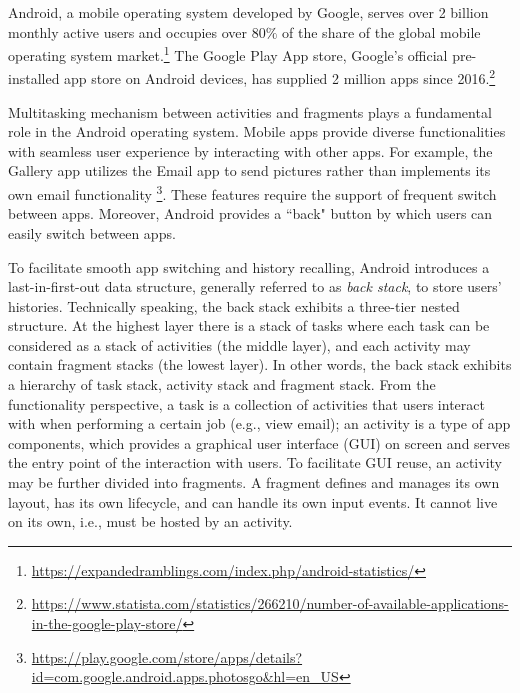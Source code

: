 
Android, a mobile operating system developed by Google, serves over 2 billion monthly active users and occupies over $80\%$ of the share of the global mobile operating system market.\footnote{\url{https://expandedramblings.com/index.php/android-statistics/}}
The Google Play App store, Google's official pre-installed app store on Android devices, has supplied 2 million apps since 2016.\footnote{\url{https://www.statista.com/statistics/266210/number-of-available-applications-in-the-google-play-store/}} 

Multitasking mechanism between activities and fragments plays a fundamental role in the Android operating system. Mobile apps provide diverse functionalities with seamless user experience by interacting with other apps.
For example, the Gallery app utilizes the Email app to send pictures rather than implements its own email
functionality \footnote{\url{https://play.google.com/store/apps/details?id=com.google.android.apps.photosgo&hl=en_US}}. These features require the support of frequent switch between apps. Moreover, Android provides a ``back" button by which users can easily switch between apps. 

To facilitate smooth app switching and history recalling, Android introduces a last-in-first-out data structure, generally referred to as \emph{back stack}, to store users’ histories.
Technically speaking, the back stack exhibits a three-tier nested structure. At the highest layer there is a stack of tasks where each task can be considered as a stack of activities (the middle layer), and each activity may contain fragment stacks (the lowest layer). In other words, the back stack exhibits a hierarchy of task stack, activity stack and fragment stack. From the functionality perspective, a task %
is a collection of activities that users interact with when performing a certain job (e.g., view email); an activity is a type of app components, which provides a graphical user interface (GUI) on screen and serves the entry point of the interaction with users. To facilitate GUI reuse, an activity may be further divided into fragments. 
A fragment defines and manages its own layout, has its own lifecycle, and can handle its own input events. It cannot live on its own, i.e., must be hosted by an activity. 

